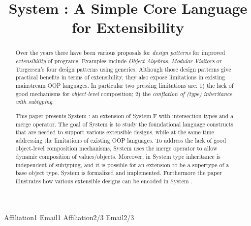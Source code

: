 \documentclass[times,10pt]{sigplanconf}
\begin{document}
\setlength{\pdfpageheight}{\paperheight}
\setlength{\pdfpagewidth}{\paperwidth}


\preprintfooter{\name}                        %

\title{System \name: A Simple Core Language for Extensibility}

           {Affiliation1}
           {Email1}
           {Affiliation2/3}
           {Email2/3}

\maketitle

\begin{abstract}
  
  Over the years there have been various proposals for \emph{design
    patterns} for improved \emph{extensibility} of programs.
  Examples include \emph{Object Algebras}, \emph{Modular Visitors} or
  Torgersen's four design patterns using generics.
  Although those design patterns give practical
  benefits in terms of extensibility, they also expose limitations in
  existing mainstream OOP languages. In particular two pressing
  limitations are: 1) the lack of good mechanisms for
  \emph{object-level} composition; 2) the \emph{conflation of 
    (type) inheritance with subtyping}.

  This paper presents System \name: an extension of System F with
  intersection types and a merge operator.  The goal of
  System \name is to study the foundational language constructs that
  are needed to support various extensible designs, while at the same
  time addressing the limitations of existing OOP languages. To
  address the lack of good object-level composition mechanisms, System
  \name uses the merge operator to allow dynamic composition of
  values/objects. Moreover, in System \name type inheritance is
  independent of subtyping, and it is possible for an extension to be
  a supertype of a base object type.  System \name is formalized and 
  implemented. Furthermore the paper illustrates how various extensible designs   
  can be encoded in System \name.

\end{abstract}
\end{document}
